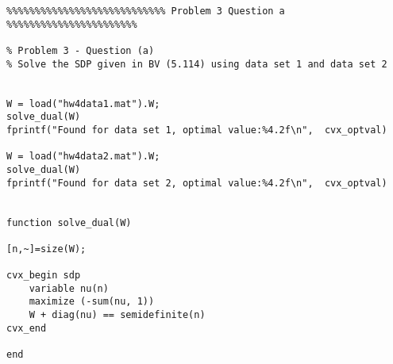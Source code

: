 \documentclass[11pt]{article}
\begin{document}
\begin{verbatim}
%%%%%%%%%%%%%%%%%%%%%%%%%%%% Problem 3 Question a %%%%%%%%%%%%%%%%%%%%%%%

% Problem 3 - Question (a) 
% Solve the SDP given in BV (5.114) using data set 1 and data set 2


W = load("hw4data1.mat").W;
solve_dual(W)
fprintf("Found for data set 1, optimal value:%4.2f\n",  cvx_optval)

W = load("hw4data2.mat").W;
solve_dual(W)
fprintf("Found for data set 2, optimal value:%4.2f\n",  cvx_optval)


function solve_dual(W)

[n,~]=size(W);

cvx_begin sdp
    variable nu(n)
    maximize (-sum(nu, 1))
    W + diag(nu) == semidefinite(n)
cvx_end

end

\end{verbatim}
\end{document}
